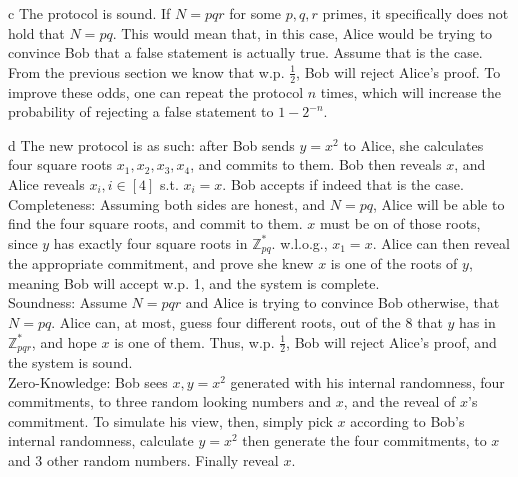 \documentclass{article}
\begin{document}
\begin{paragraph}
    c The protocol is sound. If \(N = pqr\) for some \(p, q, r\) primes, it specifically does not hold that \(N = pq\). This would mean that, in this case, Alice would be trying to convince Bob that a false statement is actually true. Assume that is the case. From the previous section we know that w.p. \(\frac{1}{2}\), Bob will reject Alice's proof. To improve these odds, one can repeat the protocol $n$ times, which will increase the probability of rejecting a false statement to $1 - 2^{-n}$.
\end{paragraph}

\begin{paragraph}
    d The new protocol is as such: after Bob sends \(y = x^2\) to Alice, she calculates four square roots \(x_1, x_2, x_3, x_4\), and commits to them. Bob then reveals \(x\), and Alice reveals \(x_i, i \in [4]\) s.t. \(x_i = x\). Bob accepts if indeed that is the case.\\
    
    Completeness: Assuming both sides are honest, and \(N = pq\), Alice will be able to find the four square roots, and commit to them. \(x\) must be on of those roots, since \(y\) has exactly four square roots in \(\mathbb{Z}^*_{pq}\). w.l.o.g., \(x_1 = x\). Alice can then reveal the appropriate commitment, and prove she knew \(x\) is one of the roots of \(y\), meaning Bob will accept w.p. 1, and the system is complete.\\
    
    Soundness: Assume \(N = pqr\) and Alice is trying to convince Bob otherwise, that \(N = pq\). Alice can, at most, guess four different roots, out of the 8 that \(y\) has in \(\mathbb{Z}^*_{pqr}\), and hope \(x\) is one of them. Thus, w.p. \(\frac{1}{2}\), Bob will reject Alice's proof, and the system is sound.\\
    
    Zero-Knowledge: Bob sees \(x, y = x^2\) generated with his internal randomness, four commitments, to three random looking numbers and \(x\), and the reveal of \(x\)'s commitment. To simulate his view, then, simply pick \(x\) according to Bob's internal randomness, calculate \(y = x^2\) then generate the four commitments, to \(x\) and 3 other random numbers. Finally reveal \(x\).
\end{paragraph}
\end{document}
